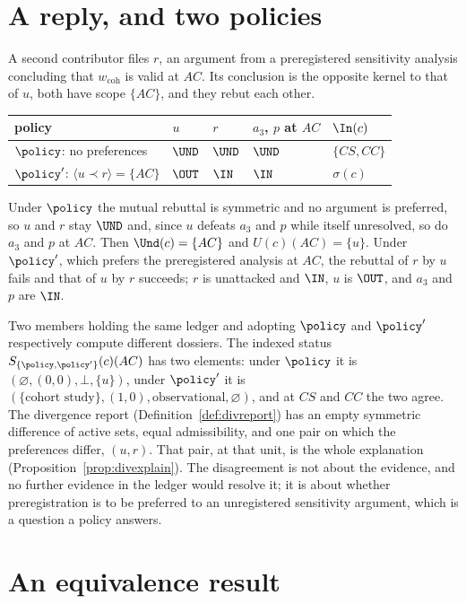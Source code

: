 \section{A reply, and two policies}\label{sec:case2reply}

A second contributor files $r$, an argument from a preregistered sensitivity analysis concluding that $w_{\mathrm{coh}}$ is valid at $AC$. Its conclusion is the opposite kernel to that of $u$, both have scope $\{AC\}$, and they rebut each other.

\begin{center}
\small
\begin{tabular}{@{}l l l l l@{}}
\toprule
policy & $u$ & $r$ & $a_3$, $p$ at $AC$ & $\In(c)$\\
\midrule
$\policy$: no preferences & $\UND$ & $\UND$ & $\UND$ & $\{CS,CC\}$\\
$\policy'$: $\langle u\prec r\rangle=\{AC\}$ & $\OUT$ & $\IN$ & $\IN$ & $\sigma(c)$\\
\bottomrule
\end{tabular}
\end{center}

Under $\policy$ the mutual rebuttal is symmetric and no argument is preferred, so $u$ and $r$ stay $\UND$ and, since $u$ defeats $a_3$ and $p$ while itself unresolved, so do $a_3$ and $p$ at $AC$. Then $\Und(c)=\{AC\}$ and $U(c)(AC)=\{u\}$. Under $\policy'$, which prefers the preregistered analysis at $AC$, the rebuttal of $r$ by $u$ fails and that of $u$ by $r$ succeeds; $r$ is unattacked and $\IN$, $u$ is $\OUT$, and $a_3$ and $p$ are $\IN$.

Two members holding the same ledger and adopting $\policy$ and $\policy'$ respectively compute different dossiers. The indexed status $S_{\{\policy,\policy'\}}(c)(AC)$ has two elements: under $\policy$ it is $(\varnothing,(0,0),\bot,\{u\})$, under $\policy'$ it is $(\{\text{cohort study}\},(1,0),\text{observational},\varnothing)$, and at $CS$ and $CC$ the two agree. The divergence report (Definition~\ref{def:divreport}) has an empty symmetric difference of active sets, equal admissibility, and one pair on which the preferences differ, $(u,r)$. That pair, at that unit, is the whole explanation (Proposition~\ref{prop:divexplain}). The disagreement is not about the evidence, and no further evidence in the ledger would resolve it; it is about whether preregistration is to be preferred to an unregistered sensitivity argument, which is a question a policy answers.

\section{An equivalence result}\label{sec:case2null}

